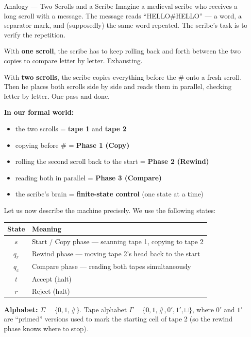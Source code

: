 \begin{notebox}{Analogy --- Two Scrolls and a Scribe}
Imagine a medieval scribe who receives a long scroll with a message. The message reads ``HELLO\#HELLO'' --- a word, a separator mark, and (supposedly) the same word repeated. The scribe's task is to verify the repetition.

With \textbf{one scroll}, the scribe has to keep rolling back and forth between the two copies to compare letter by letter. Exhausting.

With \textbf{two scrolls}, the scribe copies everything before the $\#$ onto a fresh scroll. Then he places both scrolls side by side and reads them in parallel, checking letter by letter. One pass and done.

\textbf{In our formal world:}
\begin{itemize}[nosep]
\item the two scrolls = \textbf{tape 1} and \textbf{tape 2}
\item copying before $\#$ = \textbf{Phase 1 (Copy)}
\item rolling the second scroll back to the start = \textbf{Phase 2 (Rewind)}
\item reading both in parallel = \textbf{Phase 3 (Compare)}
\item the scribe's brain = \textbf{finite-state control} (one state at a time)
\end{itemize}
\end{notebox}

Let us now describe the machine precisely. We use the following states:

\begin{center}
\begin{tabular}{cl}
\toprule
\textbf{State} & \textbf{Meaning} \\
\midrule
$s$ & Start / Copy phase --- scanning tape 1, copying to tape 2 \\
$q_r$ & Rewind phase --- moving tape 2's head back to the start \\
$q_c$ & Compare phase --- reading both tapes simultaneously \\
$t$ & Accept (halt) \\
$r$ & Reject (halt) \\
\bottomrule
\end{tabular}
\end{center}

\textbf{Alphabet:} $\Sigma = \{0, 1, \#\}$. Tape alphabet $\Gamma = \{0, 1, \#, 0', 1', \sqcup\}$, where $0'$ and $1'$ are ``primed'' versions used to mark the starting cell of tape 2 (so the rewind phase knows where to stop).

